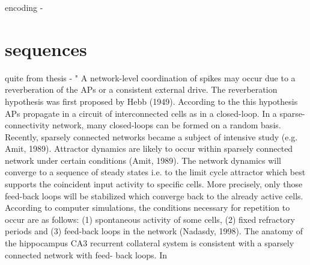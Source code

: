 \documentclass{article}
\begin{document}
encoding - 

\section*{sequences}
quite from thesis - " A network-level coordination of spikes may occur due to a reverberation of the APs or a consistent external drive. The reverberation hypothesis was first proposed by Hebb (1949). According to the this hypothesis APs propagate in a circuit of interconnected cells as in a closed-loop. In a sparse-connectivity network, many closed-loops can be formed on a random basis. Recently, sparsely connected networks became a subject of intensive study (e.g. Amit, 1989). Attractor dynamics are likely to occur within sparsely connected network under certain conditions (Amit, 1989). The network dynamics will converge to a sequence of steady states i.e. to the limit cycle attractor which best supports the coincident input activity to specific cells. More precisely, only those feed-back loops will be stabilized which converge back to the already active cells. According to computer simulations, the conditions necessary for repetition to occur are as follows: (1) spontaneous activity of some cells, (2) fixed refractory periods and (3) feed-back loops in the network (Nadasdy, 1998). The anatomy of the hippocampus CA3 recurrent collateral system is consistent with a sparsely connected network with feed- back loops. In
\end{document}
